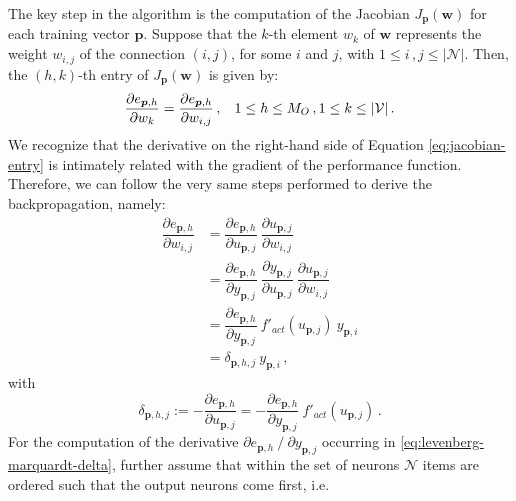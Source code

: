 \documentclass[11pt, a4paper]{report}
\numberwithin{equation}{chapter}
\theoremstyle{theorem}
\theoremstyle{definition}
\numberwithin{figure}{section}
\begin{document}
		The key step in the algorithm is the computation of the Jacobian $J_{\boldsymbol{p}}(\boldsymbol{w})$ for each training vector $\boldsymbol{p}$. Suppose that the $k$-th element $w_k$ of $\boldsymbol{w}$ represents the weight $w_{i,j}$ of the connection $(i,j)$, for some $i$ and $j$, with $1 \leq i \, , j \leq |\mathcal{N}|$. Then, the $(h,k)$-th entry of $J_{\boldsymbol{p}}(\boldsymbol{w})$ is given by:
		\begin{equation}
			\label{eq:jacobian-entry}
			\dfrac{\partial e_{\boldsymbol{p},h}}{\partial w_k} = \dfrac{\partial e_{\boldsymbol{p},h}}{\partial w_{i,j}} \, , \hspace*{0.3cm} 1 \leq h \leq M_O \, , 1 \leq k \leq |\mathcal{V}| \, .
		\end{equation}
		We recognize that the derivative on the right-hand side of Equation \eqref{eq:jacobian-entry} is intimately related with the gradient of the performance function. Therefore, we can follow the very same steps performed to derive the backpropagation, namely:
		\begin{equation}
			\label{eq:jacobian-entry-equation}
			\begin{aligned}
				\dfrac{\partial e_{\boldsymbol{p},h}}{\partial w_{i,j}} & = \dfrac{\partial e_{\boldsymbol{p},h}}{\partial u_{\boldsymbol{p},j}} ~ \dfrac{\partial u_{\boldsymbol{p},j}}{\partial w_{i,j}} \\[0.1cm]
				& = \dfrac{\partial e_{\boldsymbol{p},h}}{\partial y_{\boldsymbol{p},j}} ~ \dfrac{\partial y_{\boldsymbol{p},j}}{\partial u_{\boldsymbol{p},j}} ~ \dfrac{\partial u_{\boldsymbol{p},j}}{\partial w_{i,j}} \\[0.1cm]
				& = \dfrac{\partial e_{\boldsymbol{p},h}}{\partial y_{\boldsymbol{p},j}} ~ f'_{act}(u_{\boldsymbol{p},j}) ~ y_{\boldsymbol{p},i} \\
				& = \delta_{\boldsymbol{p},h,j} ~ y_{\boldsymbol{p},i} \, ,
			\end{aligned}
		\end{equation} 
		with
		\begin{equation}
			\label{eq:levenberg-marquardt-delta}
			\delta_{\boldsymbol{p},h,j} := - \dfrac{\partial e_{\boldsymbol{p},h}}{\partial u_{\boldsymbol{p},j}} = - \dfrac{\partial e_{\boldsymbol{p},h}}{\partial y_{\boldsymbol{p},j}} ~ f'_{act}(u_{\boldsymbol{p},j}) \, .
		\end{equation}
		For the computation of the derivative $\partial e_{\boldsymbol{p},h} ~ / ~ \partial y_{\boldsymbol{p},j}$ occurring in \eqref{eq:levenberg-marquardt-delta}, further assume that within the set of neurons $\mathcal{N}$ items are ordered such that the output neurons come first, i.e.
\end{document}
